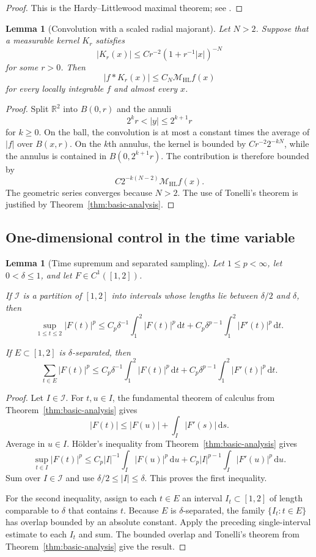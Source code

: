 \documentclass[11pt]{article}
\numberwithin{equation}{section}
\newtheorem{lemma}[theorem]{Lemma}
\theoremstyle{definition}
\theoremstyle{remark}
\newcommand{\R}{\mathbb R}
\newcommand{\MHL}{\mathcal M_{\mathrm{HL}}}
\newcommand{\dd}{\,\mathrm d}
\begin{document}
\begin{proof}
This is the Hardy--Littlewood maximal theorem; see \cite[Chapter~I, Section~1]{Stein1970}.
\end{proof}

\begin{lemma}[Convolution with a scaled radial majorant]\label{lem:radial-majorant}
Let $N>2$.  Suppose that a measurable kernel $K_r$ satisfies
\[
|K_r(x)|\le C r^{-2}(1+r^{-1}|x|)^{-N}
\]
for some $r>0$.  Then
\[
|f*K_r(x)|\le C_N\MHL f(x)
\]
for every locally integrable $f$ and almost every $x$.
\end{lemma}

\begin{proof}
Split $\R^2$ into $B(0,r)$ and the annuli
\[
2^kr<|y|\le2^{k+1}r
\]
for $k\ge0$.  On the ball, the convolution is at most a constant times the average of $|f|$ over $B(x,r)$.  On the $k$th annulus, the kernel is bounded by $C r^{-2}2^{-kN}$, while the annulus is contained in $B(0,2^{k+1}r)$.  The contribution is therefore bounded by
\[
C2^{-k(N-2)}\MHL f(x).
\]
The geometric series converges because $N>2$.  The use of Tonelli's theorem is justified by Theorem~\ref{thm:basic-analysis}.
\end{proof}

\subsection{One-dimensional control in the time variable}

\begin{lemma}[Time supremum and separated sampling]\label{lem:time-sobolev}
Let $1\le p<\infty$, let $0<\delta\le1$, and let $F\in C^1([1,2])$.

If $\mathcal I$ is a partition of $[1,2]$ into intervals whose lengths lie between $\delta/2$ and $\delta$, then
\[
\sup_{1\le t\le2}|F(t)|^p
\le C_p\delta^{-1}\int_1^2|F(t)|^p\dd t
+C_p\delta^{p-1}\int_1^2|F'(t)|^p\dd t.
\]

If $E\subset[1,2]$ is $\delta$-separated, then
\[
\sum_{t\in E}|F(t)|^p
\le C_p\delta^{-1}\int_1^2|F(t)|^p\dd t
+C_p\delta^{p-1}\int_1^2|F'(t)|^p\dd t.
\]
\end{lemma}

\begin{proof}
Let $I\in\mathcal I$.  For $t,u\in I$, the fundamental theorem of calculus from Theorem~\ref{thm:basic-analysis} gives
\[
|F(t)|\le |F(u)|+\int_I|F'(s)|\dd s.
\]
Average in $u\in I$.  H\"older's inequality from Theorem~\ref{thm:basic-analysis} gives
\[
\sup_{t\in I}|F(t)|^p
\le C_p|I|^{-1}\int_I|F(u)|^p\dd u
+C_p|I|^{p-1}\int_I|F'(u)|^p\dd u.
\]
Sum over $I\in\mathcal I$ and use $\delta/2\le|I|\le\delta$.  This proves the first inequality.

For the second inequality, assign to each $t\in E$ an interval $I_t\subset[1,2]$ of length comparable to $\delta$ that contains $t$.  Because $E$ is $\delta$-separated, the family $\{I_t:t\in E\}$ has overlap bounded by an absolute constant.  Apply the preceding single-interval estimate to each $I_t$ and sum.  The bounded overlap and Tonelli's theorem from Theorem~\ref{thm:basic-analysis} give the result.
\end{proof}
\end{document}
